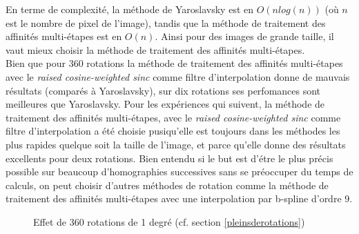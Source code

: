 En terme de complexité, la méthode de Yaroslavsky est en $O(n log(n))$ (où $n$ est le nombre de pixel de l'image), tandis que la méthode de traitement des affinités multi-étapes est en $O(n)$. Ainsi pour des images de grande taille, il vaut mieux choisir la méthode de traitement des affinités multi-étapes.\\

Bien que pour 360 rotations la méthode de traitement des affinités multi-étapes avec le \emph{raised cosine-weighted sinc} comme filtre d'interpolation donne de mauvais résultats (comparés à Yaroslavsky), sur dix rotations ses perfomances sont meilleures que Yaroslavsky.
Pour les expériences qui suivent, la méthode de traitement des affinités multi-étapes, avec le \emph{raised cosine-weighted sinc} comme filtre d'interpolation a été choisie pusiqu'elle est toujours dans les méthodes les plus rapides quelque soit la taille de l'image, et parce qu'elle donne des résultats excellents pour deux rotations. 
Bien entendu si le but est d'étre le plus précis possible sur beaucoup d'homographies successives sans se préoccuper du temps de calculs, on peut choisir d'autres méthodes de rotation comme la méthode de traitement des affinités multi-étapes  avec une interpolation par b-spline d'ordre 9.

 \begin{figure}[h]
 \centering
  
\caption{Effet de 360 rotations de 1 degré (cf. section \ref{pleinsderotations})}
\label{troiscentrotations}
 \end{figure}

